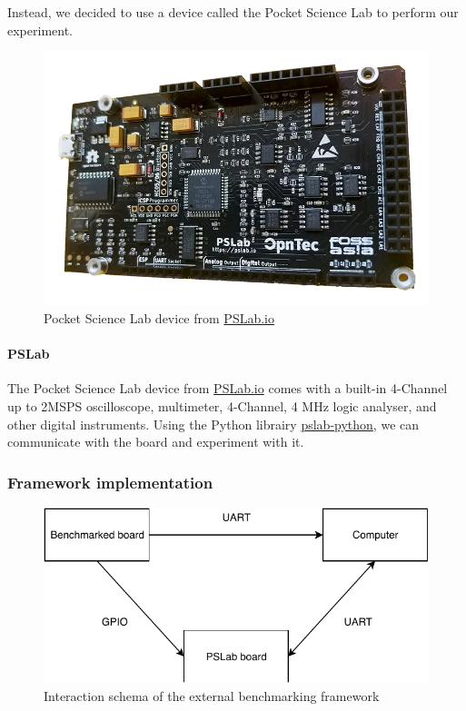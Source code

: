 Instead, we decided to use a device called the Pocket Science Lab to perform our experiment.


\begin{figure}[!ht]
  \centering
  \includegraphics[scale=0.25]{assets/pslab.png}
  \caption{\label{fig:pslab}Pocket Science Lab device from \href{https://pslab.io}{PSLab.io}}
\end{figure}

\paragraph{PSLab}
The Pocket Science Lab device from \href{https://pslab.io}{PSLab.io} comes with a built-in 4-Channel up to 2MSPS oscilloscope, multimeter, 4-Channel, 4 MHz logic analyser, and other digital instruments.
Using the Python librairy \href{https://github.com/fossasia/pslab-python}{pslab-python}, we can communicate with the board and experiment with it.

\subsubsection{Framework implementation}




\begin{figure}
  \centering
  \includegraphics[scale=1]{assets/external-benchmarking-framework-schema.pdf}
  \caption{\label{fig:external-benchmarking-framework-schema}Interaction schema of the external benchmarking framework}
\end{figure}

